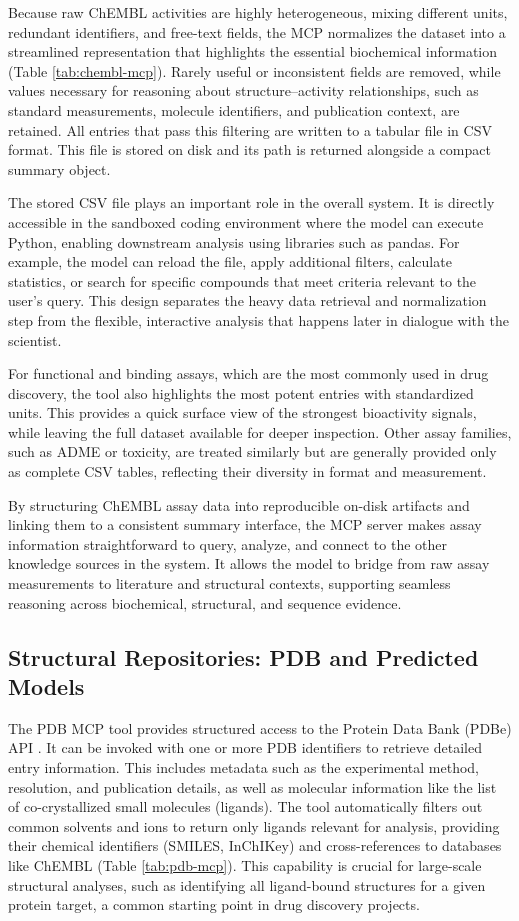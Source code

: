 \documentclass{article}
\begin{document}
Because raw ChEMBL activities are highly heterogeneous, mixing different units, redundant identifiers, and free-text fields, the MCP normalizes the dataset into a streamlined representation that highlights the essential biochemical information (Table \ref{tab:chembl-mcp}). Rarely useful or inconsistent fields are removed, while values necessary for reasoning about structure–activity relationships, such as standard measurements, molecule identifiers, and publication context, are retained. All entries that pass this filtering are written to a tabular file in CSV format. This file is stored on disk and its path is returned alongside a compact summary object.

The stored CSV file plays an important role in the overall system. It is directly accessible in the sandboxed coding environment where the model can execute Python, enabling downstream analysis using libraries such as pandas. For example, the model can reload the file, apply additional filters, calculate statistics, or search for specific compounds that meet criteria relevant to the user’s query. This design separates the heavy data retrieval and normalization step from the flexible, interactive analysis that happens later in dialogue with the scientist.

For functional and binding assays, which are the most commonly used in drug discovery, the tool also highlights the most potent entries with standardized units. This provides a quick surface view of the strongest bioactivity signals, while leaving the full dataset available for deeper inspection. Other assay families, such as ADME or toxicity, are treated similarly but are generally provided only as complete CSV tables, reflecting their diversity in format and measurement.

By structuring ChEMBL assay data into reproducible on-disk artifacts and linking them to a consistent summary interface, the MCP server makes assay information straightforward to query, analyze, and connect to the other knowledge sources in the system. It allows the model to bridge from raw assay measurements to literature and structural contexts, supporting seamless reasoning across biochemical, structural, and sequence evidence.

\subsection{Structural Repositories: PDB and Predicted Models}\label{sec:data:pdb}
The PDB MCP tool provides structured access to the Protein Data Bank (PDBe) API \citep{Burley2018}. It can be invoked with one or more PDB identifiers to retrieve detailed entry information. This includes metadata such as the experimental method, resolution, and publication details, as well as molecular information like the list of co-crystallized small molecules (ligands). The tool automatically filters out common solvents and ions to return only ligands relevant for analysis, providing their chemical identifiers (SMILES, InChIKey) and cross-references to databases like ChEMBL (Table \ref{tab:pdb-mcp}). This capability is crucial for large-scale structural analyses, such as identifying all ligand-bound structures for a given protein target, a common starting point in drug discovery projects.
\end{document}

